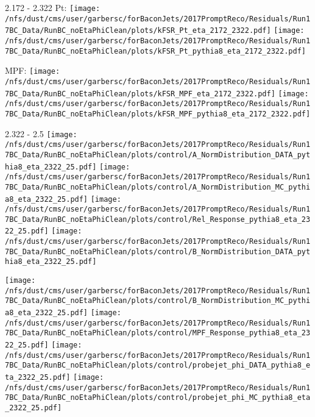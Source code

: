 \documentclass[t,compress]{beamer}
\begin{document}
\begin{frame}{2.172 - 2.322}
	 Pt: \texttt{[image: /nfs/dust/cms/user/garbersc/forBaconJets/2017PromptReco/Residuals/Run17BC\_Data/RunBC\_noEtaPhiClean/plots/kFSR\_Pt\_eta\_2172\_2322.pdf]}
	\texttt{[image: /nfs/dust/cms/user/garbersc/forBaconJets/2017PromptReco/Residuals/Run17BC\_Data/RunBC\_noEtaPhiClean/plots/kFSR\_Pt\_pythia8\_eta\_2172\_2322.pdf]}
\newline

	 MPF: \texttt{[image: /nfs/dust/cms/user/garbersc/forBaconJets/2017PromptReco/Residuals/Run17BC\_Data/RunBC\_noEtaPhiClean/plots/kFSR\_MPF\_eta\_2172\_2322.pdf]}
	\texttt{[image: /nfs/dust/cms/user/garbersc/forBaconJets/2017PromptReco/Residuals/Run17BC\_Data/RunBC\_noEtaPhiClean/plots/kFSR\_MPF\_pythia8\_eta\_2172\_2322.pdf]}
\end{frame}

\begin{frame}{2.322 - 2.5}
	\texttt{[image: /nfs/dust/cms/user/garbersc/forBaconJets/2017PromptReco/Residuals/Run17BC\_Data/RunBC\_noEtaPhiClean/plots/control/A\_NormDistribution\_DATA\_pythia8\_eta\_2322\_25.pdf]}
	\texttt{[image: /nfs/dust/cms/user/garbersc/forBaconJets/2017PromptReco/Residuals/Run17BC\_Data/RunBC\_noEtaPhiClean/plots/control/A\_NormDistribution\_MC\_pythia8\_eta\_2322\_25.pdf]}
	\texttt{[image: /nfs/dust/cms/user/garbersc/forBaconJets/2017PromptReco/Residuals/Run17BC\_Data/RunBC\_noEtaPhiClean/plots/control/Rel\_Response\_pythia8\_eta\_2322\_25.pdf]}
	\texttt{[image: /nfs/dust/cms/user/garbersc/forBaconJets/2017PromptReco/Residuals/Run17BC\_Data/RunBC\_noEtaPhiClean/plots/control/B\_NormDistribution\_DATA\_pythia8\_eta\_2322\_25.pdf]}
\newline

	\texttt{[image: /nfs/dust/cms/user/garbersc/forBaconJets/2017PromptReco/Residuals/Run17BC\_Data/RunBC\_noEtaPhiClean/plots/control/B\_NormDistribution\_MC\_pythia8\_eta\_2322\_25.pdf]}
	\texttt{[image: /nfs/dust/cms/user/garbersc/forBaconJets/2017PromptReco/Residuals/Run17BC\_Data/RunBC\_noEtaPhiClean/plots/control/MPF\_Response\_pythia8\_eta\_2322\_25.pdf]}
	\texttt{[image: /nfs/dust/cms/user/garbersc/forBaconJets/2017PromptReco/Residuals/Run17BC\_Data/RunBC\_noEtaPhiClean/plots/control/probejet\_phi\_DATA\_pythia8\_eta\_2322\_25.pdf]}
	\texttt{[image: /nfs/dust/cms/user/garbersc/forBaconJets/2017PromptReco/Residuals/Run17BC\_Data/RunBC\_noEtaPhiClean/plots/control/probejet\_phi\_MC\_pythia8\_eta\_2322\_25.pdf]}
\end{frame}
\end{document}
